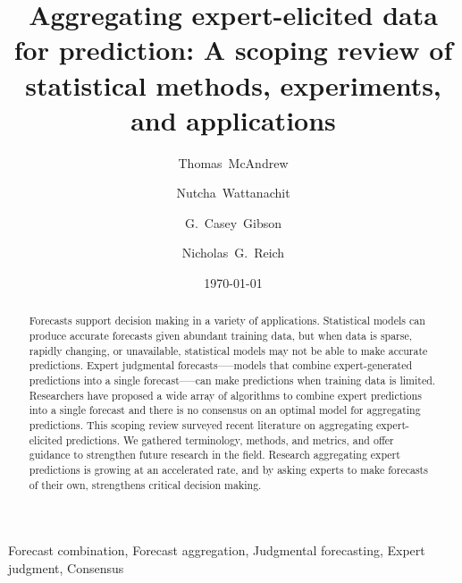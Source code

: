 \documentclass[preprint]{elsarticle}
\date{\today}
\begin{document}
   \begin{frontmatter}

     \title{Aggregating expert-elicited data for prediction: A scoping review of statistical methods, experiments, and applications }

     \author[1]{Thomas~McAndrew }
     
     \author[1]{Nutcha~Wattanachit}

     \author[1]{G.~Casey~Gibson}
     
     \author[1]{Nicholas~G.~Reich}
     
     
     
      \address[1]{Department of Biostatistics and Epidemiology, School of Public Health and Health Sciences, University of Massachusetts at Amherst, Amherst, Massachusetts, United States of America}

\begin{abstract}
  Forecasts support decision making in a variety of applications.
  Statistical models can produce accurate forecasts given abundant training data, but when data is sparse, rapidly changing, or unavailable, statistical models may not be able to make accurate predictions.
  Expert judgmental forecasts--—models that combine expert-generated predictions into a single forecast—--can make predictions when training data is limited.
  Researchers have proposed a wide array of algorithms to combine expert predictions into a single forecast and there is no consensus on an optimal model for aggregating predictions.
  This scoping review surveyed recent literature on aggregating expert-elicited predictions.
  We gathered terminology, methods, and metrics, and offer guidance to strengthen future research in the field.
  Research aggregating expert predictions is growing at an accelerated rate, and by asking experts to make forecasts of their own, strengthens critical decision making.
\end{abstract}

\begin{keyword}
Forecast combination, Forecast aggregation, Judgmental forecasting, Expert judgment, Consensus 
\end{keyword}

\end{frontmatter}
\end{document}
